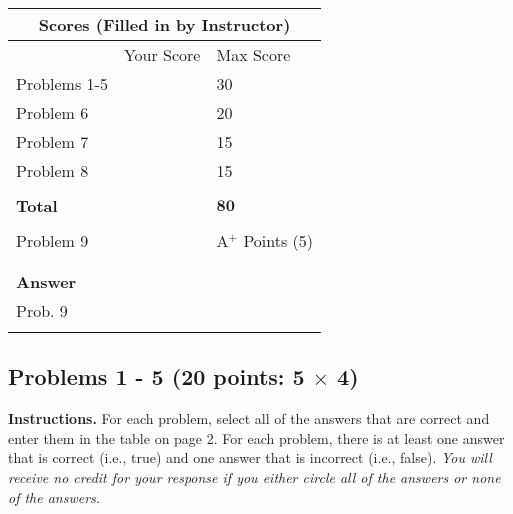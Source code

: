 \documentclass[letterpaper]{article}
\begin{document}
\vspace*{1 in}

\begin{center}
\LARGE
\begin{tabular}{|p{1.5in}|p{2.5in}|p{1.5in}|}
\hline
\multicolumn{3}{|c|}{\textbf{Scores (Filled in by Instructor)}}\\
\hline
 & Your Score& Max Score \\
\hline
Problems 1-5 &  &   30\\
\hline
Problem 6 &  &   20\\
\hline
Problem 7 &  &   15\\
\hline
Problem 8 &  &   15\\
\hline
& & \\
\hline
\textbf{Total} &  &   $\mathbf{80}$\\
\hline
& & \\
\hline
Problem 9 &  &   A$^+$ Points (5)\\
\hline
& & \\
& & \\
\hline
\textbf{Answer}  &   &   \\
 Prob. 9 & \makebox[10cm][l]{$\begin{array}{ccc}\qquad  & \qquad& \qquad \\ \widehat{X} =\qquad  & \qquad & \qquad \\ \qquad & \qquad& \qquad \end{array}$} &   \\
 & & \\
\hline
\end{tabular}
\end{center}


\newpage

%
%
%

\newpage



\subsection*{Problems 1 - 5 {\rm (20 points: 5 $\times$ 4)}}

{\bf Instructions.} For each problem, select all of the answers that are correct and enter them in the table on page 2. For each problem, there is at least one answer that is correct (i.e., true) and one answer that is incorrect (i.e., false). \textit{You will receive no credit for your response if you either circle all of the answers or none of the answers.}
\end{document}

